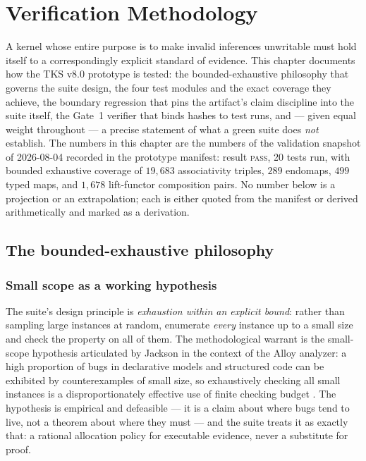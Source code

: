 \chapter{Verification Methodology}\label{ch10:testing}

A kernel whose entire purpose is to make invalid inferences unwritable must
hold itself to a correspondingly explicit standard of evidence. This
chapter documents how the TKS v8.0 prototype is tested: the
bounded-exhaustive philosophy that governs the suite design, the four test
modules and the exact coverage they achieve, the boundary regression that
pins the artifact's claim discipline into the suite itself, the Gate~1
verifier that binds hashes to test runs, and --- given equal weight
throughout --- a precise statement of what a green suite does \emph{not}
establish. The numbers in this chapter are the numbers of the validation
snapshot of 2026-08-04 recorded in the prototype manifest: result
\textsc{pass}, 20 tests run, with bounded exhaustive coverage of
$19{,}683$ associativity triples, $289$ endomaps, $499$ typed maps, and
$1{,}678$ lift-functor composition pairs. No number below is a projection
or an extrapolation; each is either quoted from the manifest or derived
arithmetically and marked as a derivation.

\section{The bounded-exhaustive philosophy}\label{ch10:sec:philosophy}

\subsection{Small scope as a working hypothesis}

The suite's design principle is \emph{exhaustion within an explicit bound}:
rather than sampling large instances at random, enumerate \emph{every}
instance up to a small size and check the property on all of them. The
methodological warrant is the small-scope hypothesis articulated by
Jackson in the context of the Alloy analyzer: a high proportion of bugs in
declarative models and structured code can be exhibited by counterexamples
of small size, so exhaustively checking all small instances is a
disproportionately effective use of finite checking budget
\cite{jackson}. The hypothesis is empirical and defeasible --- it is a
claim about where bugs tend to live, not a theorem about where they must
--- and the suite treats it as exactly that: a rational allocation policy
for executable evidence, never a substitute for proof.

